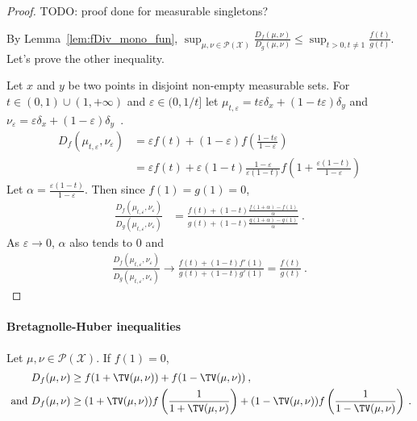 \begin{proof}%
{}
TODO: proof done for measurable singletons?

By Lemma~\ref{lem:fDiv_mono_fun}, $\sup_{\mu, \nu \in \mathcal P(\mathcal X)} \frac{D_f(\mu, \nu)}{D_g(\mu, \nu)} \le \sup_{t > 0, t \ne 1} \frac{f(t)}{g(t)}$. Let's prove the other inequality.

Let $x$ and $y$ be two points in disjoint non-empty measurable sets. For $t \in (0,1) \cup (1, +\infty)$ and $\varepsilon \in (0, 1/t]$ let $\mu_{t, \varepsilon} = t \varepsilon \delta_x + (1 - t \varepsilon) \delta_y$ and $\nu_\varepsilon = \varepsilon \delta_x + (1 - \varepsilon) \delta_y$~.
\begin{align*}
D_f(\mu_{t, \varepsilon}, \nu_\varepsilon)
&= \varepsilon f(t) + (1 - \varepsilon) f(\frac{1 - t \varepsilon}{1 - \varepsilon})
\\
&= \varepsilon f(t) + \varepsilon (1 - t) \frac{1 - \varepsilon}{\varepsilon (1 - t)} f(1 + \frac{\varepsilon(1 - t)}{1 - \varepsilon})
\end{align*}
Let $\alpha = \frac{\varepsilon (1 - t)}{1 - \varepsilon}$. Then since $f(1) = g(1) = 0$,
\begin{align*}
\frac{D_f(\mu_{t, \varepsilon}, \nu_\varepsilon)}{D_g(\mu_{t, \varepsilon}, \nu_\varepsilon)}
&= \frac{f(t) + (1 - t)\frac{f(1 + \alpha) - f(1)}{\alpha}}{g(t) + (1 - t)\frac{g(1 + \alpha) - g(1)}{\alpha}} \: .
\end{align*}
As $\varepsilon \to 0$, $\alpha$ also tends to 0 and
\begin{align*}
\frac{D_f(\mu_{t, \varepsilon}, \nu_\varepsilon)}{D_g(\mu_{t, \varepsilon}, \nu_\varepsilon)}
\to \frac{f(t) + (1 - t)f'(1)}{g(t) + (1 - t)g'(1)}
= \frac{f(t)}{g(t)}
\: .
\end{align*}
\end{proof}

\paragraph{Bretagnolle-Huber inequalities}

\begin{theorem}
  \label{thm:bh_fDiv}
  \leanok
  Let $\mu, \nu \in \mathcal P(\mathcal X)$. If $f(1) = 0$,
  \begin{align*}
  D_f(\mu, \nu)
  &\ge f(1 + \TV(\mu, \nu)) + f(1 - \TV(\mu, \nu))
  \: , \\
  \text{ and }
  D_f(\mu, \nu)
  &\ge (1 + \TV(\mu, \nu))f\left(\frac{1}{1 + \TV(\mu, \nu)}\right) + (1 - \TV(\mu, \nu))f\left(\frac{1}{1 - \TV(\mu, \nu)}\right)
  \: .
  \end{align*}
\end{theorem}

